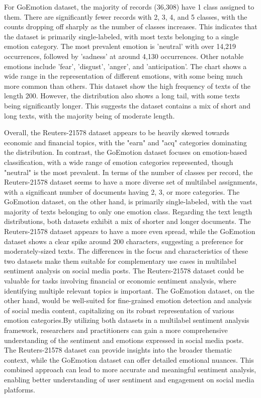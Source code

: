\documentclass{article}
\begin{document}
For GoEmotion dataset, the majority of records (36,308) have 1 class assigned to them. There are significantly fewer records with 2, 3, 4, and 5 classes, with the counts dropping off sharply as the number of classes increases. This indicates that the dataset is primarily single-labeled, with most texts belonging to a single emotion category. The most prevalent emotion is 'neutral' with over 14,219 occurrences, followed by 'sadness' at around 4,130 occurrences. Other notable emotions include 'fear', 'disgust', 'anger', and 'anticipation'. The chart shows a wide range in the representation of different emotions, with some being much more common than others. This dataset show the high frequency of texts of the length 200. However, the distribution also shows a long tail, with some texts being significantly longer. This suggests the dataset contains a mix of short and long texts, with the majority being of moderate length.

Overall, the Reuters-21578 dataset appears to be heavily skewed towards economic and financial topics, with the "earn" and "acq" categories dominating the distribution. In contrast, the GoEmotion dataset focuses on emotion-based classification, with a wide range of emotion categories represented, though "neutral" is the most prevalent. In terms of the number of classes per record, the Reuters-21578 dataset seems to have a more diverse set of multilabel assignments, with a significant number of documents having 2, 3, or more categories. The GoEmotion dataset, on the other hand, is primarily single-labeled, with the vast majority of texts belonging to only one emotion class. Regarding the text length distributions, both datasets exhibit a mix of shorter and longer documents. The Reuters-21578 dataset appears to have a more even spread, while the GoEmotion dataset shows a clear spike around 200 characters, suggesting a preference for moderately-sized texts. The differences in the focus and characteristics of these two datasets make them suitable for complementary use cases in multilabel sentiment analysis on social media posts. The Reuters-21578 dataset could be valuable for tasks involving financial or economic sentiment analysis, where identifying multiple relevant topics is important. The GoEmotion dataset, on the other hand, would be well-suited for fine-grained emotion detection and analysis of social media content, capitalizing on its robust representation of various emotion categories.By utilizing both datasets in a multilabel sentiment analysis framework, researchers and practitioners can gain a more comprehensive understanding of the sentiment and emotions expressed in social media posts. The Reuters-21578 dataset can provide insights into the broader thematic context, while the GoEmotion dataset can offer detailed emotional nuances. This combined approach can lead to more accurate and meaningful sentiment analysis, enabling better understanding of user sentiment and engagement on social media platforms.
\end{document}
